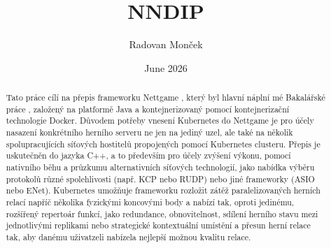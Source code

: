 \documentclass{article}
\title{NNDIP}
\author{Radovan Monček}
\date{June 2026}
\begin{document}
\maketitle


\begin{abstract}
Tato práce cílí na přepis frameworku Nettgame 
\cite{moncek_nettgame} \cite{moncek_theses}, který byl hlavní náplní mé Bakalářské práce 
\cite{moncek_theses}, založený na platformě Java a kontejnerizovaný pomocí kontejnerizační technologie Docker. Důvodem potřeby vnesení Kubernetes do Nettgame je pro účely nasazení konkrétního herního serveru ne jen na jediný uzel, ale také na několik spolupracujících síťových hostitelů propojených pomocí Kubernetes clusteru. Přepis je uskutečněn do jazyka C++, a to především pro účely zvýšení výkonu, pomocí nativního běhu a průzkumu alternativních síťových technologií, jako nabídka výběru protokolů různé spolehlivosti (např. KCP nebo RUDP) nebo jiné frameworky (ASIO nebo ENet). Kubernetes umožňuje frameworku rozložit zátěž paralelizovaných herních relací napříč několika fyzickými koncovými body a nabízí tak, oproti jedinému, rozšířený repertoár funkcí, jako redundance, obnovitelnost, sdílení herního stavu mezi jednotlivými replikami nebo strategické kontextuální umístění a přesun herní relace tak, aby danému uživatzeli nabízela nejlepší možnou kvalitu relace.
\end{abstract}
\end{document}

